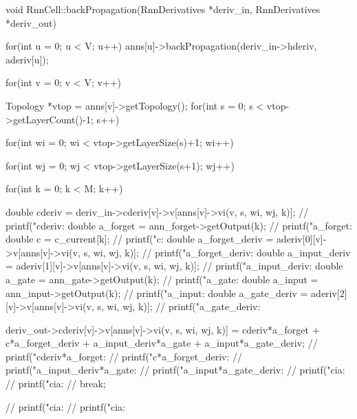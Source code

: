 void RnnCell::backPropagation(RnnDerivatives *deriv_in, RnnDerivatives *deriv_out){



  for(int u = 0; u < V; u++)
    anns[u]->backPropagation(deriv_in->hderiv, aderiv[u]);



  for(int v = 0; v < V; v++){

    Topology *vtop = anns[v]->getTopology();
    for(int s = 0; s < vtop->getLayerCount()-1; s++){

      for(int wi = 0; wi < vtop->getLayerSize(s)+1; wi++){

        for(int wj = 0; wj < vtop->getLayerSize(s+1); wj++){


          for(int k = 0; k < M; k++){

            double cderiv = deriv_in->cderiv[v]->v[anns[v]->vi(v, s, wi, wj, k)];
            // printf("cderiv: %
            double a_forget = ann_forget->getOutput(k);
            // printf("a_forget: %
            double c = c_current[k];
            // printf("c: %
            double a_forget_deriv = aderiv[0][v]->v[anns[v]->vi(v, s, wi, wj, k)];
            // printf("a_forget_deriv: %
            double a_input_deriv = aderiv[1][v]->v[anns[v]->vi(v, s, wi, wj, k)];
            // printf("a_input_deriv: %
            double a_gate = ann_gate->getOutput(k);
            // printf("a_gate: %
            double a_input = ann_input->getOutput(k);
            // printf("a_input: %
            double a_gate_deriv = aderiv[2][v]->v[anns[v]->vi(v, s, wi, wj, k)];
            // printf("a_gate_deriv: %

            deriv_out->cderiv[v]->v[anns[v]->vi(v, s, wi, wj, k)] = cderiv*a_forget + c*a_forget_deriv + a_input_deriv*a_gate + a_input*a_gate_deriv;
            // printf("cderiv*a_forget:  %
            // printf("c*a_forget_deriv:  %
            // printf("a_input_deriv*a_gate:  %
            // printf("a_input*a_gate_deriv:  %
            // printf("cia:  %
            // printf("cia:  %
            // break;
          }
        }
      }
    }
    // printf("cia:  %
    // printf("cia:  %


}}
